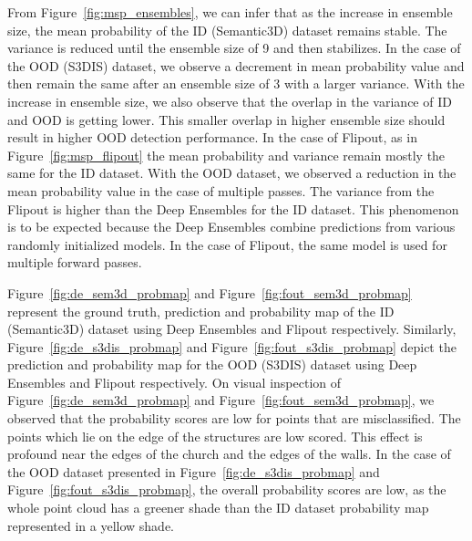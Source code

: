     From Figure~\ref{fig:msp_ensembles}, we can infer that as the increase in ensemble size, the mean probability of the ID (Semantic3D) dataset remains stable.
    The variance is reduced until the ensemble size of 9 and then stabilizes.
    In the case of the OOD (S3DIS) dataset, we observe a decrement in mean probability value and then remain the same after an ensemble size of 3 with a larger variance.
    With the increase in ensemble size, we also observe that the overlap in the variance of ID and OOD is getting lower.
    This smaller overlap in higher ensemble size should result in higher OOD detection performance.
    In the case of Flipout, as in Figure~\ref{fig:msp_flipout} the mean probability and variance remain mostly the same for the ID dataset.
    With the OOD dataset, we observed a reduction in the mean probability value in the case of multiple passes.
    The variance from the Flipout is higher than the Deep Ensembles for the ID dataset.
    This phenomenon is to be expected because the Deep Ensembles combine predictions from various randomly initialized models.
    In the case of Flipout, the same model is used for multiple forward passes.

    Figure~\ref{fig:de_sem3d_probmap} and Figure~\ref{fig:fout_sem3d_probmap} represent the ground truth, prediction and probability map of the ID (Semantic3D) dataset using Deep Ensembles and Flipout respectively.
    Similarly, Figure~\ref{fig:de_s3dis_probmap} and Figure~\ref{fig:fout_s3dis_probmap} depict the prediction and probability map for the OOD (S3DIS) dataset using Deep Ensembles and Flipout respectively.
    On visual inspection of Figure~\ref{fig:de_sem3d_probmap} and Figure~\ref{fig:fout_sem3d_probmap}, we observed that the probability scores are low for points that are misclassified.
    The points which lie on the edge of the structures are low scored.
    This effect is profound near the edges of the church and the edges of the walls.
    In the case of the OOD dataset presented in Figure~\ref{fig:de_s3dis_probmap} and Figure~\ref{fig:fout_s3dis_probmap}, the overall probability scores are low, as the whole point cloud has a greener shade than the ID dataset probability map represented in a yellow shade.

